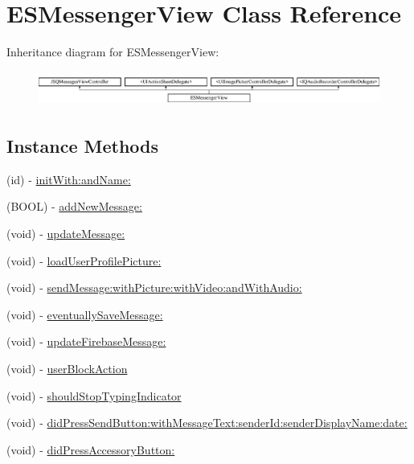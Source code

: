 \hypertarget{interface_e_s_messenger_view}{}\section{E\+S\+Messenger\+View Class Reference}
\label{interface_e_s_messenger_view}
Inheritance diagram for E\+S\+Messenger\+View\+:\begin{figure}[H]
\begin{center}
\leavevmode
\includegraphics[height=1.171548cm]{interface_e_s_messenger_view}
\end{center}
\end{figure}
\subsection*{Instance Methods}
\begin{DoxyCompactItemize}
\item 
(id) -\/ \hyperlink{interface_e_s_messenger_view_a20949dd05e02e5d8f57c7425cc7cd188}{init\+With\+:and\+Name\+:}
\item 
(B\+O\+O\+L) -\/ \hyperlink{interface_e_s_messenger_view_a455e132b8747f85a1d8deac1a68a4f24}{add\+New\+Message\+:}
\item 
(void) -\/ \hyperlink{interface_e_s_messenger_view_a4d7787efab802a88a679a9bfe7cfee04}{update\+Message\+:}
\item 
(void) -\/ \hyperlink{interface_e_s_messenger_view_a029364852259871644d4dc868e3eebcb}{load\+User\+Profile\+Picture\+:}
\item 
(void) -\/ \hyperlink{interface_e_s_messenger_view_a39888ee6f75bc085702e2cf1dab53c76}{send\+Message\+:with\+Picture\+:with\+Video\+:and\+With\+Audio\+:}
\item 
(void) -\/ \hyperlink{interface_e_s_messenger_view_ab08e11c5fca909ecd876651ff5491fc9}{eventually\+Save\+Message\+:}
\item 
(void) -\/ \hyperlink{interface_e_s_messenger_view_a8b91a1196d4f8c614696b9334918829c}{update\+Firebase\+Message\+:}
\item 
(void) -\/ \hyperlink{interface_e_s_messenger_view_a469661b88cf9b21e8d03adfbd80f859c}{user\+Block\+Action}
\item 
(void) -\/ \hyperlink{interface_e_s_messenger_view_a1eaa6a89f233335eaa55563ed0f518fd}{should\+Stop\+Typing\+Indicator}
\item 
(void) -\/ \hyperlink{interface_e_s_messenger_view_a0e46ee68f6a3523270b9133bc0bc1341}{did\+Press\+Send\+Button\+:with\+Message\+Text\+:sender\+Id\+:sender\+Display\+Name\+:date\+:}
\item 
(void) -\/ \hyperlink{interface_e_s_messenger_view_a13ba4513938bfdbd75f380485e4a6b98}{did\+Press\+Accessory\+Button\+:}
\end{DoxyCompactItemize}


